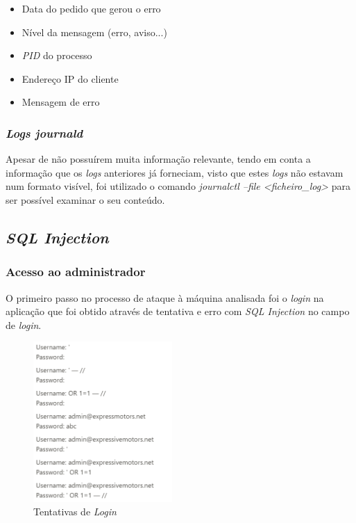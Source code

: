\documentclass[10pt,english]{article}
\begin{document}
\begin{itemize}
    \item Data do pedido que gerou o erro
    \item Nível da mensagem (erro, aviso...)
    \item \textit{PID} do processo
    \item Endereço IP do cliente
    \item Mensagem de erro
\end{itemize}

\subsubsection{\textit{Logs journald}}

\par Apesar de não possuírem muita informação relevante, tendo em conta a informação que os \textit{logs} anteriores já forneciam, visto que estes \textit{logs} não estavam num formato visível, foi utilizado o comando \textit{journalctl --file <ficheiro\_log>} para ser possível examinar o seu conteúdo.

\clearpage

\subsection{\textit{SQL Injection}}
\subsubsection{Acesso ao administrador}
\par O primeiro passo no processo de ataque à máquina analisada foi o \textit{login} na aplicação que foi obtido através de tentativa e erro com \textit{SQL Injection} no campo de \textit{login}.

\begin{figure}[h]
    \centering
    \includegraphics[width=200]{images/TentativasLogin.png}
    \caption{Tentativas de \textit{Login}}
\end{figure}
\end{document}
